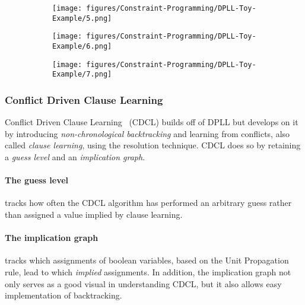 \begin{figure}[H]
    \centering
    \begin{subfigure}[t]{0.45\textwidth}
        \centering
        \texttt{[image: figures/Constraint-Programming/DPLL-Toy-Example/5.png]}
    \end{subfigure}
    \begin{subfigure}[t]{0.45\textwidth}
        \centering
        \texttt{[image: figures/Constraint-Programming/DPLL-Toy-Example/6.png]}
    \end{subfigure}
\end{figure}
\begin{figure}[H]
    \centering
    \begin{subfigure}[t]{0.45\textwidth}
        \centering
        \texttt{[image: figures/Constraint-Programming/DPLL-Toy-Example/7.png]}
    \end{subfigure}
\end{figure}

\subsubsection{Conflict Driven Clause Learning}
Conflict Driven Clause Learning~\cite{CDCL-1, CDCL-2, CDCL-3} (CDCL) builds off of DPLL but develops on it by introducing \textit{non-chronological backtracking} and learning from conflicts, also called \textit{clause learning},  using the resolution technique. CDCL does so by retaining a \emph{guess level} and an \emph{implication graph}.
\paragraph{The guess level} tracks how often the CDCL algorithm has performed an arbitrary guess rather than assigned a value implied by clause learning.
\paragraph{The implication graph} tracks which assignments of boolean variables, based on the Unit Propagation rule, lead to which \emph{implied} assignments. In addition, the implication graph not only serves as a good visual in understanding CDCL, but it also allows easy implementation of backtracking.


